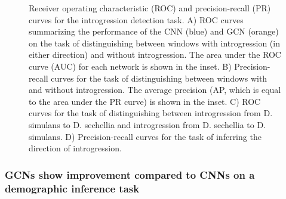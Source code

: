 \begin{figure}
    \centering
    \caption[Receiver operating characteristic (ROC) and precision-recall (PR) curves for the introgression detection task]{Receiver operating characteristic (ROC) and precision-recall (PR) curves for the introgression detection task. A) ROC curves summarizing the performance of the CNN (blue) and GCN (orange) on the task of distinguishing between windows with introgression (in either direction) and without introgression. The area under the ROC curve (AUC) for each network is shown in the inset. B) Precision-recall curves for the task of distinguishing between windows with and without introgression. The average precision (AP, which is equal to the area under the PR curve) is shown in the inset. C) ROC curves for the task of distinguishing between introgression from D. simulans to D. sechellia and introgression from D. sechellia to D. simulans. D) Precision-recall curves for the task of inferring the direction of introgression.}
    \label{fig:2_6}
\end{figure}

\subsubsection{GCNs show improvement compared to CNNs on a demographic inference task}


